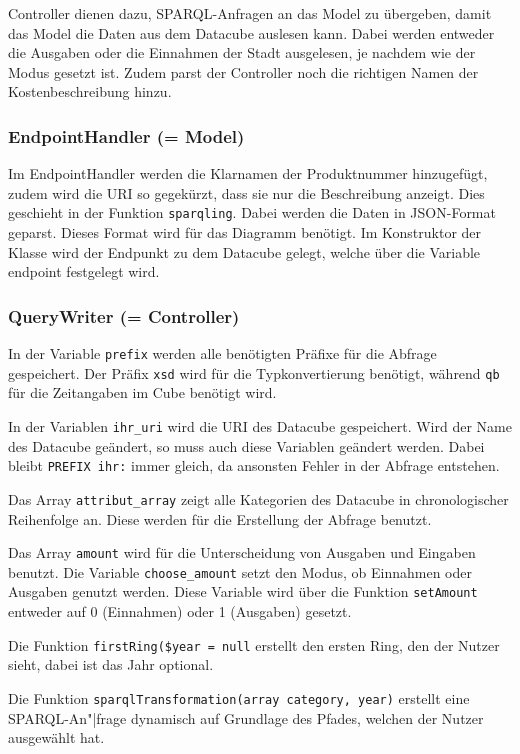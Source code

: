 \documentclass[a4paper,11pt,twoside]{article}
\begin{document}
Controller dienen dazu, SPARQL-Anfragen an das Model zu übergeben, damit
das Model die Daten aus dem Datacube auslesen kann. Dabei werden entweder die
Ausgaben oder die Einnahmen der Stadt ausgelesen, je nachdem wie der Modus
gesetzt ist. Zudem parst der Controller noch die richtigen Namen der
Kostenbeschreibung hinzu.

\subsubsection{EndpointHandler (= Model)}
Im EndpointHandler werden die Klarnamen der Produktnummer hinzugefügt, zudem
wird die URI so gegekürzt, dass sie nur die Beschreibung anzeigt. Dies
geschieht in der Funktion \texttt{sparqling}. Dabei werden die Daten in
JSON-Format geparst. Dieses Format wird für das Diagramm benötigt. Im
Konstruktor der Klasse wird der Endpunkt zu dem Datacube gelegt, welche über
die Variable endpoint festgelegt wird.

\subsubsection{QueryWriter (= Controller)}
In der Variable \texttt{prefix} werden alle benötigten Präfixe für die Abfrage
gespeichert. Der Präfix \texttt{xsd} wird für die Typkonvertierung benötigt,
während \texttt{qb} für die Zeitangaben im Cube benötigt wird.

In der Variablen \texttt{ihr\_uri} wird die URI des Datacube gespeichert. Wird
der Name des Datacube geändert, so muss auch diese Variablen geändert
werden. Dabei bleibt \texttt{PREFIX ihr:} immer gleich, da ansonsten Fehler in
der Abfrage entstehen. 

Das Array \texttt{attribut\_array} zeigt alle Kategorien des Datacube in
chronologischer Reihenfolge an. Diese werden für die Erstellung der Abfrage
benutzt. 

Das Array \texttt{amount} wird für die Unterscheidung von Ausgaben und
Eingaben benutzt. Die Variable \texttt{choose\_amount} setzt den Modus, ob
Einnahmen oder Ausgaben genutzt werden. Diese Variable wird über die Funktion
\texttt{setAmount} entweder auf 0 (Einnahmen) oder 1 (Ausgaben) gesetzt.  

Die Funktion \texttt{firstRing(\$year = null} erstellt den ersten Ring, den
der Nutzer sieht, dabei ist das Jahr optional. 

Die Funktion \texttt{sparqlTransformation(array category, year)} erstellt eine
SPARQL-An"|frage dynamisch auf Grundlage des Pfades, welchen der Nutzer
ausgewählt hat.
\end{document}
